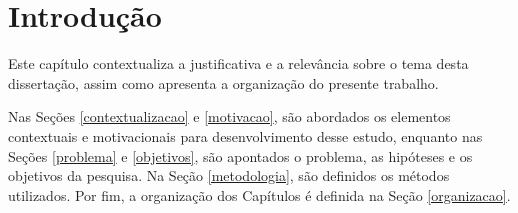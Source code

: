 \chapter{Introdução}
\label{chap:intro}

Este capítulo contextualiza a justificativa e a relevância sobre o tema desta dissertação, assim como apresenta a organização do presente trabalho. 

Nas Seções \ref{contextualizacao} e \ref{motivacao}, são abordados os elementos contextuais e motivacionais para desenvolvimento desse estudo, enquanto nas Seções \ref{problema} e \ref{objetivos}, são apontados o problema, as hipóteses e os objetivos da pesquisa. Na Seção \ref{metodologia}, são definidos os métodos utilizados. Por fim, a organização dos Capítulos é definida na Seção \ref{organizacao}.

 

  
  
  
 
 
      
 

 
% 
 
% 

%

%

%  
